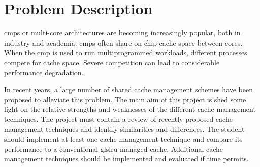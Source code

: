 
\section*{Problem Description}
\glspl{cmp} or multi-core architectures are becoming increasingly popular, both in industry and academia. 
\glspl{cmp} often share on-chip cache space between cores. 
When the \gls{cmp} is used to run multiprogrammed workloads, different processes compete for cache space. 
Severe competition can lead to considerable performance degradation. 

In recent years, a large number of shared cache management schemes have been proposed to alleviate this problem.
The main aim of this project is shed some light on the relative strengths and weaknesses of the different cache management techniques. 
The project must contain a review of recently proposed cache management techniques and identify similarities and differences. 
The student should implement at least one cache management technique and compare its performance to a conventional gls{lru}-managed cache.
Additional cache management techniques should be implemented and evaluated if time permits.

\clearpage